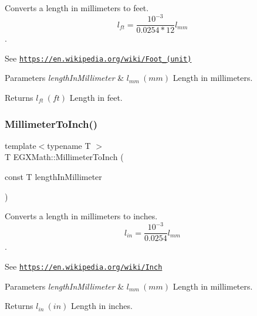 Converts a length in millimeters to feet. \[ l_{ft}= \frac{10^{-3}}{0.0254 * 12} l_{mm} \]. 

See \href{https://en.wikipedia.org/wiki/Foot_(unit)}{\tt https\+://en.\+wikipedia.\+org/wiki/\+Foot\+\_\+(unit)} 
\begin{DoxyParams}{Parameters}
{\em length\+In\+Millimeter} & $ l_{mm}\ (mm)$ Length in millimeters. \\
\hline
\end{DoxyParams}
\begin{DoxyReturn}{Returns}
$ l_{ft}\ (ft)$ Length in feet. 
\end{DoxyReturn}
\mbox{\label{group___e_g_x_math-_conversions-_length_conversions-_millimeter-_imperial_gaaf0d8029c38ed975edf3805a0a3a53f7}} 
\subsubsection{\texorpdfstring{Millimeter\+To\+Inch()}{MillimeterToInch()}}
{\footnotesize\ttfamily template$<$typename T $>$ \\
T E\+G\+X\+Math\+::\+Millimeter\+To\+Inch (\begin{DoxyParamCaption}\item[{const T}]{length\+In\+Millimeter }\end{DoxyParamCaption})}



Converts a length in millimeters to inches. \[ l_{in}= \frac{10^{-3}}{0.0254} l_{mm} \]. 

See \href{https://en.wikipedia.org/wiki/Inch}{\tt https\+://en.\+wikipedia.\+org/wiki/\+Inch} 
\begin{DoxyParams}{Parameters}
{\em length\+In\+Millimeter} & $ l_{mm}\ (mm)$ Length in millimeters. \\
\hline
\end{DoxyParams}
\begin{DoxyReturn}{Returns}
$ l_{in}\ (in)$ Length in inches. 
\end{DoxyReturn}
\mbox{\label{group___e_g_x_math-_conversions-_length_conversions-_millimeter-_imperial_gaf811317f4ce575df4ff0329491e92fac}} 
